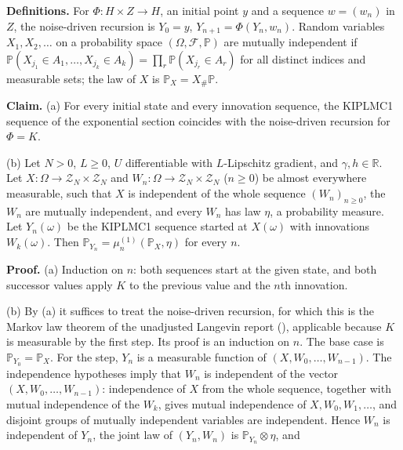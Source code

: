 \documentclass[11pt,a4paper]{report}
\begin{document}
\textbf{Definitions.} For \(\Phi:H\times Z\to H\), an initial point \(y\) and a sequence \(w=(w_n)\) in \(Z\), the noise-driven recursion is \(Y_0=y\), \(Y_{n+1}=\Phi(Y_n,w_n)\). Random variables \(X_1,X_2,\dots\) on a probability space \((\Omega,\mathcal F,\mathbb P)\) are mutually independent if \(\mathbb P(X_{j_1}\in A_1,\dots,X_{j_k}\in A_k)=\prod_r\mathbb P(X_{j_r}\in A_r)\) for all distinct indices and measurable sets; the law of \(X\) is \(\mathbb P_X=X_\#\mathbb P\).




\textbf{Claim.} (a) For every initial state and every innovation sequence, the KIPLMC1 sequence of the exponential section coincides with the noise-driven recursion for \(\Phi=K\).




(b) Let \(N>0\), \(L\ge0\), \(U\) differentiable with \(L\)-Lipschitz gradient, and \(\gamma,h\in\mathbb R\). Let \(X:\Omega\to\mathcal Z_N\times\mathcal Z_N\) and \(W_n:\Omega\to\mathcal Z_N\times\mathcal Z_N\) (\(n\ge0\)) be almost everywhere measurable, such that \(X\) is independent of the whole sequence \((W_n)_{n\ge0}\), the \(W_n\) are mutually independent, and every \(W_n\) has law \(\eta\), a probability measure. Let \(Y_n(\omega)\) be the KIPLMC1 sequence started at \(X(\omega)\) with innovations \(W_k(\omega)\). Then \(\mathbb P_{Y_n}=\mu^{(1)}_n(\mathbb P_X,\eta)\) for every \(n\).




\textbf{Proof.} (a) Induction on \(n\): both sequences start at the given state, and both successor values apply \(K\) to the previous value and the \(n\)th innovation.




(b) By (a) it suffices to treat the noise-driven recursion, for which this is the Markov law theorem of the unadjusted Langevin report (\cite[Section~3.33.12]{LangevinLean2026ULASC}), applicable because \(K\) is measurable by the first step. Its proof is an induction on \(n\). The base case is \(\mathbb P_{Y_0}=\mathbb P_X\). For the step, \(Y_n\) is a measurable function of \((X,W_0,\dots,W_{n-1})\). The independence hypotheses imply that \(W_n\) is independent of the vector \((X,W_0,\dots,W_{n-1})\): independence of \(X\) from the whole sequence, together with mutual independence of the \(W_k\), gives mutual independence of \(X,W_0,W_1,\dots\), and disjoint groups of mutually independent variables are independent. Hence \(W_n\) is independent of \(Y_n\), the joint law of \((Y_n,W_n)\) is \(\mathbb P_{Y_n}\otimes\eta\), and
\end{document}
